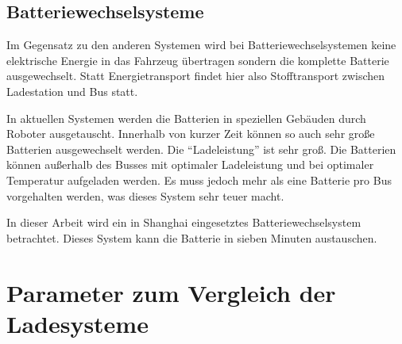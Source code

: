 \subsection{Batteriewechselsysteme}
Im Gegensatz zu den anderen Systemen wird bei Batteriewechselsystemen keine elektrische Energie in das Fahrzeug übertragen sondern die komplette Batterie ausgewechselt. Statt Energietransport findet hier also Stofftransport zwischen Ladestation und Bus statt. 

In aktuellen Systemen werden die Batterien in speziellen Gebäuden durch Roboter ausgetauscht. Innerhalb von kurzer Zeit können so auch sehr große Batterien ausgewechselt werden. Die "`Ladeleistung"' ist sehr groß. Die Batterien können außerhalb des Busses mit optimaler Ladeleistung und bei optimaler Temperatur aufgeladen werden. Es muss jedoch mehr als eine Batterie pro Bus vorgehalten werden, was dieses System sehr teuer macht.

In dieser Arbeit wird ein in Shanghai eingesetztes Batteriewechselsystem betrachtet. Dieses System kann die Batterie in sieben Minuten austauschen.


\section{Parameter zum Vergleich der Ladesysteme}
\label{parameter}

